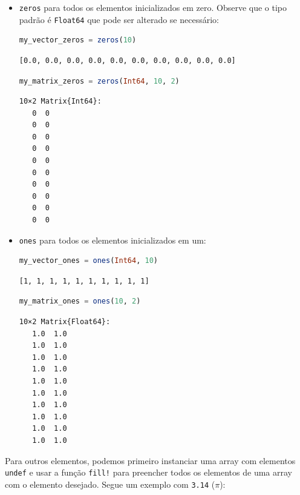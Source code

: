 \documentclass[
  notoc %
]{tufte-book}
\newcommand{\passthrough}[1]{#1}
\begin{document}
\begin{itemize}
\item
  \passthrough{\lstinline!zeros!} para todos os elementos inicializados
  em zero. Observe que o tipo padrão é \passthrough{\lstinline!Float64!}
  que pode ser alterado se necessário:

  \begin{lstlisting}[language=Julia]
  my_vector_zeros = zeros(10)
  \end{lstlisting}

  \begin{lstlisting}[language=Output]
  [0.0, 0.0, 0.0, 0.0, 0.0, 0.0, 0.0, 0.0, 0.0, 0.0]
  \end{lstlisting}

  \begin{lstlisting}[language=Julia]
  my_matrix_zeros = zeros(Int64, 10, 2)
  \end{lstlisting}

  \begin{lstlisting}[language=Output]
  10×2 Matrix{Int64}:
   0  0
   0  0
   0  0
   0  0
   0  0
   0  0
   0  0
   0  0
   0  0
   0  0
  \end{lstlisting}
\item
  \passthrough{\lstinline!ones!} para todos os elementos inicializados
  em um:

  \begin{lstlisting}[language=Julia]
  my_vector_ones = ones(Int64, 10)
  \end{lstlisting}

  \begin{lstlisting}[language=Output]
  [1, 1, 1, 1, 1, 1, 1, 1, 1, 1]
  \end{lstlisting}

  \begin{lstlisting}[language=Julia]
  my_matrix_ones = ones(10, 2)
  \end{lstlisting}

  \begin{lstlisting}[language=Output]
  10×2 Matrix{Float64}:
   1.0  1.0
   1.0  1.0
   1.0  1.0
   1.0  1.0
   1.0  1.0
   1.0  1.0
   1.0  1.0
   1.0  1.0
   1.0  1.0
   1.0  1.0
  \end{lstlisting}
\end{itemize}

Para outros elementos, podemos primeiro instanciar uma array com
elementos \passthrough{\lstinline!undef!} e usar a função
\passthrough{\lstinline"fill!"} para preencher todos os elementos de uma
array com o elemento desejado. Segue um exemplo com
\passthrough{\lstinline!3.14!} (\(\pi\)):
\end{document}
